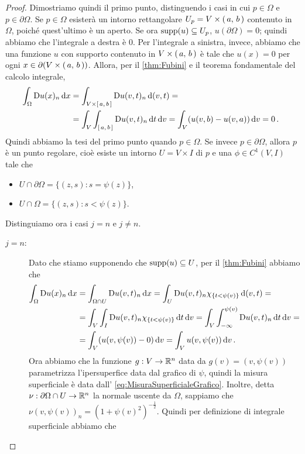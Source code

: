\begin{proof}
	Dimostriamo quindi il primo punto, distinguendo i casi in cui $p\in \Omega$ e $p\in \partial \Omega$.
	Se $p\in \Omega$ esisterà un intorno rettangolare $U_p=V\times \left(\,a,\,b\,\right)$ contenuto in $\Omega$, poiché quest'ultimo è un aperto. Se ora $\operatorname{supp}(u)\subseteq U_p$,
	$u(\partial \Omega)=0$; quindi abbiamo che l'integrale a destra è $0$. Per l'integrale a sinistra, invece, abbiamo che una funzione $u$
	con supporto contenuto in $V\times \left(\,a,\,b\,\right)$ è tale che $u(x)=0$ per ogni
	$x\in \partial (V\times \left(\,a,\,b\,\right))$. Allora, per il \cref{thm:Fubini} e il teorema fondamentale del calcolo integrale,
	\begin{align*}
		\int_{\Omega} \mathrm D u(x)_n \,\mathrm d x &= \int_{V\times \left[\,a,\,b\,\right]} \mathrm D u(v,t)_n \,\mathrm d (v,t) = \\
		& = \int_V \int_{\left[\,a,\,b\,\right]} \mathrm D u(v,t)_n \,\mathrm d t \,\mathrm d v = \int_V (u(v,b) - u(v,a)) \,\mathrm d v = 0\, \text{. }
	\end{align*}
	Quindi abbiamo la tesi del primo punto quando $p\in\Omega$. Se invece $p\in \partial \Omega$, allora $p$ è un punto regolare, cioè esiste
	un intorno $U=V\times I$ di $p$ e una $\phi\in C^1(V,I)$ tale che
	\begin{itemize}
		\item $U\cap \partial \Omega = \{(z,s):s=\psi(z)\}$,
		\item $U\cap \Omega = \{(z,s):s<\psi(z)\}$.
	\end{itemize}
	Distinguiamo ora i casi $j=n$ e $j\neq n$.
	\begin{description}
		\item [$j=n$:] Dato che stiamo supponendo che $\operatorname{supp}(u)\subseteq U$, per il \cref{thm:Fubini} abbiamo che
			\begin{align*}
				\int_{\Omega} \mathrm D u(x)_n \,\mathrm d x  &= \int_{\Omega\cap U} \mathrm D u(v,t)_n\,\mathrm d x =
				\int_{U} \mathrm D u(v,t)_n \chi_{\{t<\psi(v)\}} \,\mathrm d (v,t) = \\
				& = \int_V \int_I \mathrm D u(v,t)_n \chi_{\{t<\psi(v)\}} \,\mathrm d t \,\mathrm d v =
				\int_V \int_{-\infty}^{\psi(v)} \mathrm D u(v,t)_n \,\mathrm d t \,\mathrm d v = \\
				& = \int_V (u(v,\psi(v)) - 0) \,\mathrm d v = \int_V u(v,\psi(v)) \,\mathrm d v\, \text{. }
			\end{align*}
			Ora abbiamo che la funzione $g:V\rightarrow \mathbb R^n$ data da $g(v)=(v,\psi(v))$ parametrizza l'ipersuperfice data dal grafico di
			$\psi$, quindi la misura superficiale è data dall' \cref{eq:MisuraSuperficialeGrafico}.
			Inoltre, detta $\nu:\partial \Omega \cap U \rightarrow \mathbb R^n$ la normale uscente da $\Omega$, sappiamo che
			$\nu(v,\psi(v))_n=(1+\psi(v)^2)^{-\frac{1}{2}}$. Quindi per definizione di integrale superficiale abbiamo che

\end{description}
\end{proof}
